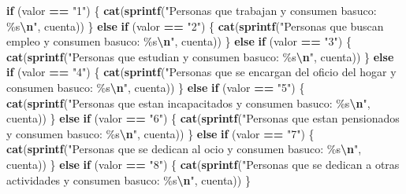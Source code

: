 \documentclass[
]{article}
\newenvironment{Shaded}{\begin{snugshade}}{\end{snugshade}}
\newcommand{\ControlFlowTok}[1]{\textcolor[rgb]{0.13,0.29,0.53}{\textbf{#1}}}
\newcommand{\FunctionTok}[1]{\textcolor[rgb]{0.13,0.29,0.53}{\textbf{#1}}}
\newcommand{\NormalTok}[1]{#1}
\newcommand{\SpecialCharTok}[1]{\textcolor[rgb]{0.81,0.36,0.00}{\textbf{#1}}}
\newcommand{\StringTok}[1]{\textcolor[rgb]{0.31,0.60,0.02}{#1}}
\begin{document}
\begin{Shaded}
\begin{Highlighting}[]
  \ControlFlowTok{if}\NormalTok{ (valor }\SpecialCharTok{==} \StringTok{"1"}\NormalTok{) \{}
    \FunctionTok{cat}\NormalTok{(}\FunctionTok{sprintf}\NormalTok{(}\StringTok{"Personas que trabajan y consumen basuco: \%s}\SpecialCharTok{\textbackslash{}n}\StringTok{"}\NormalTok{, cuenta))}
\NormalTok{  \} }\ControlFlowTok{else} \ControlFlowTok{if}\NormalTok{ (valor }\SpecialCharTok{==} \StringTok{"2"}\NormalTok{) \{}
    \FunctionTok{cat}\NormalTok{(}\FunctionTok{sprintf}\NormalTok{(}\StringTok{"Personas que buscan empleo y consumen basuco: \%s}\SpecialCharTok{\textbackslash{}n}\StringTok{"}\NormalTok{, cuenta))}
\NormalTok{  \} }\ControlFlowTok{else} \ControlFlowTok{if}\NormalTok{ (valor }\SpecialCharTok{==} \StringTok{"3"}\NormalTok{) \{}
    \FunctionTok{cat}\NormalTok{(}\FunctionTok{sprintf}\NormalTok{(}\StringTok{"Personas que estudian y consumen basuco: \%s}\SpecialCharTok{\textbackslash{}n}\StringTok{"}\NormalTok{, cuenta))}
\NormalTok{  \} }\ControlFlowTok{else} \ControlFlowTok{if}\NormalTok{ (valor }\SpecialCharTok{==} \StringTok{"4"}\NormalTok{) \{}
    \FunctionTok{cat}\NormalTok{(}\FunctionTok{sprintf}\NormalTok{(}\StringTok{"Personas que se encargan del oficio del hogar y consumen basuco: \%s}\SpecialCharTok{\textbackslash{}n}\StringTok{"}\NormalTok{, cuenta))}
\NormalTok{  \} }\ControlFlowTok{else} \ControlFlowTok{if}\NormalTok{ (valor }\SpecialCharTok{==} \StringTok{"5"}\NormalTok{) \{}
    \FunctionTok{cat}\NormalTok{(}\FunctionTok{sprintf}\NormalTok{(}\StringTok{"Personas que estan incapacitados y consumen basuco: \%s}\SpecialCharTok{\textbackslash{}n}\StringTok{"}\NormalTok{, cuenta))}
\NormalTok{  \} }\ControlFlowTok{else} \ControlFlowTok{if}\NormalTok{ (valor }\SpecialCharTok{==} \StringTok{"6"}\NormalTok{) \{}
    \FunctionTok{cat}\NormalTok{(}\FunctionTok{sprintf}\NormalTok{(}\StringTok{"Personas que estan pensionados y consumen basuco: \%s}\SpecialCharTok{\textbackslash{}n}\StringTok{"}\NormalTok{, cuenta))}
\NormalTok{  \} }\ControlFlowTok{else} \ControlFlowTok{if}\NormalTok{ (valor }\SpecialCharTok{==} \StringTok{"7"}\NormalTok{) \{}
    \FunctionTok{cat}\NormalTok{(}\FunctionTok{sprintf}\NormalTok{(}\StringTok{"Personas que se dedican al ocio y consumen basuco: \%s}\SpecialCharTok{\textbackslash{}n}\StringTok{"}\NormalTok{, cuenta))}
\NormalTok{  \} }\ControlFlowTok{else} \ControlFlowTok{if}\NormalTok{ (valor }\SpecialCharTok{==} \StringTok{"8"}\NormalTok{) \{}
    \FunctionTok{cat}\NormalTok{(}\FunctionTok{sprintf}\NormalTok{(}\StringTok{"Personas que se dedican a otras actividades y consumen basuco: \%s}\SpecialCharTok{\textbackslash{}n}\StringTok{"}\NormalTok{, cuenta))}
\NormalTok{  \}}
  

\end{Highlighting}
\end{Shaded}
\end{document}
